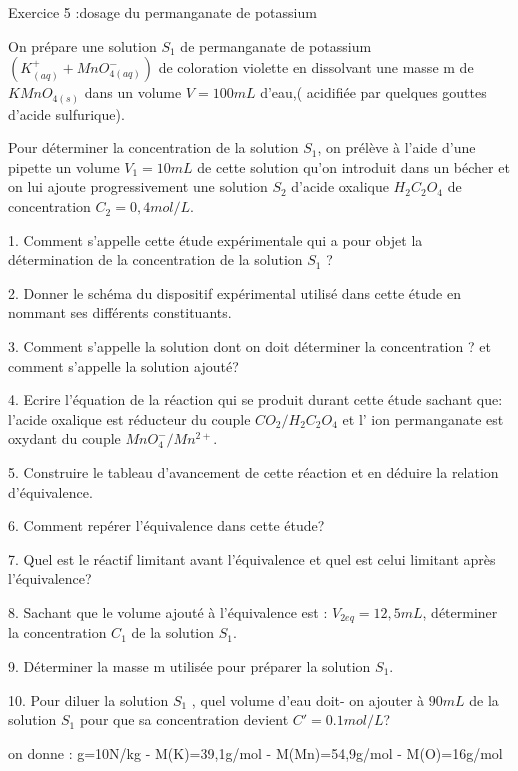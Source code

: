 \documentclass[12pt, french]{article}
\begin{document}

\begin{Box2}{Exercice 5 :dosage du permanganate de potassium }
 
   On prépare une solution $S_1$ de permanganate de potassium $(K^+_{(aq)} + MnO^-_{4 (aq)})$ de coloration violette en dissolvant une
   masse m de $KMnO_{4 (s)}$ dans un volume $V=100mL$ d'eau,( acidifiée par quelques gouttes d'acide sulfurique).

Pour déterminer la concentration de la solution $S_1$, on prélève à l'aide d'une pipette un volume $V_1=10mL$ de cette solution qu'on introduit dans un bécher et on lui ajoute progressivement une solution $S_2$ d'acide oxalique $H_2C_2O_4$ de
concentration $C_2=0,4mol/L$.

1. Comment s'appelle cette étude expérimentale qui a pour objet la détermination de la concentration de la solution $S_1$ ?

2. Donner le schéma du dispositif expérimental utilisé dans cette étude en nommant ses différents constituants.

3. Comment s'appelle la solution dont on doit déterminer la concentration ? et comment s'appelle la solution ajouté?

4. Ecrire l'équation de la réaction qui se produit durant cette étude sachant que:
l'acide oxalique est réducteur du couple $CO_2/H_2C_2O_4$ et l' ion permanganate est oxydant du couple $MnO_4^-/Mn^{2+}$.

5. Construire le tableau d'avancement de cette réaction et en déduire la relation d'équivalence.

6. Comment repérer l'équivalence dans cette étude?

   7. Quel est le réactif limitant avant l'équivalence et quel est celui limitant après l'équivalence?

   8. Sachant que le volume ajouté à l'équivalence est : $V_{2eq}=12,5mL$, déterminer la concentration $C_1$ de la solution $S_1$.

9. Déterminer la masse m utilisée pour préparer la solution $S_1$.

10. Pour diluer la solution $S_1$ , quel volume d'eau doit- on ajouter à $90mL$ de la solution $S_1$ pour que sa concentration devient $ C'=0.1 mol/L $?

on donne : g=10N/kg - M(K)=39,1g/mol - M(Mn)=54,9g/mol - M(O)=16g/mol
\end{Box2}

\end{document}
